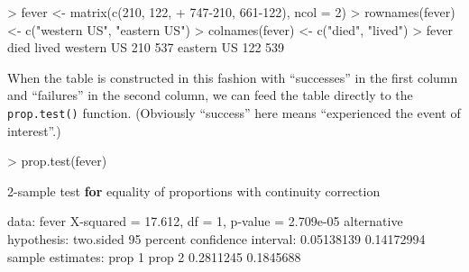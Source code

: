 \documentclass[
]{book}
\newenvironment{Shaded}{\begin{snugshade}}{\end{snugshade}}
\newcommand{\AttributeTok}[1]{\textcolor[rgb]{0.77,0.63,0.00}{#1}}
\newcommand{\ControlFlowTok}[1]{\textcolor[rgb]{0.13,0.29,0.53}{\textbf{#1}}}
\newcommand{\DecValTok}[1]{\textcolor[rgb]{0.00,0.00,0.81}{#1}}
\newcommand{\FloatTok}[1]{\textcolor[rgb]{0.00,0.00,0.81}{#1}}
\newcommand{\FunctionTok}[1]{\textcolor[rgb]{0.00,0.00,0.00}{#1}}
\newcommand{\NormalTok}[1]{#1}
\newcommand{\OtherTok}[1]{\textcolor[rgb]{0.56,0.35,0.01}{#1}}
\newcommand{\SpecialCharTok}[1]{\textcolor[rgb]{0.00,0.00,0.00}{#1}}
\newcommand{\StringTok}[1]{\textcolor[rgb]{0.31,0.60,0.02}{#1}}
\begin{document}
\begin{Shaded}
\begin{Highlighting}[]
\SpecialCharTok{\textgreater{}}\NormalTok{ fever }\OtherTok{\textless{}{-}} \FunctionTok{matrix}\NormalTok{(}\FunctionTok{c}\NormalTok{(}\DecValTok{210}\NormalTok{, }\DecValTok{122}\NormalTok{,}
\SpecialCharTok{+}                   \DecValTok{747{-}210}\NormalTok{, }\DecValTok{661{-}122}\NormalTok{), }\AttributeTok{ncol =} \DecValTok{2}\NormalTok{)}
\SpecialCharTok{\textgreater{}} \FunctionTok{rownames}\NormalTok{(fever) }\OtherTok{\textless{}{-}} \FunctionTok{c}\NormalTok{(}\StringTok{"western US"}\NormalTok{, }\StringTok{"eastern US"}\NormalTok{)}
\SpecialCharTok{\textgreater{}} \FunctionTok{colnames}\NormalTok{(fever) }\OtherTok{\textless{}{-}} \FunctionTok{c}\NormalTok{(}\StringTok{"died"}\NormalTok{, }\StringTok{"lived"}\NormalTok{)}
\SpecialCharTok{\textgreater{}}\NormalTok{ fever}
\NormalTok{           died lived}
\NormalTok{western US  }\DecValTok{210}   \DecValTok{537}
\NormalTok{eastern US  }\DecValTok{122}   \DecValTok{539}
\end{Highlighting}
\end{Shaded}

When the table is constructed in this fashion with ``successes'' in the first column and ``failures'' in the second column, we can feed the table directly to the \texttt{prop.test()} function. (Obviously ``success'' here means ``experienced the event of interest''.)

\begin{Shaded}
\begin{Highlighting}[]
\SpecialCharTok{\textgreater{}} \FunctionTok{prop.test}\NormalTok{(fever)}

    \DecValTok{2}\SpecialCharTok{{-}}\NormalTok{sample test }\ControlFlowTok{for}\NormalTok{ equality of proportions with continuity correction}

\NormalTok{data}\SpecialCharTok{:}\NormalTok{  fever}
\NormalTok{X}\SpecialCharTok{{-}}\NormalTok{squared }\OtherTok{=} \FloatTok{17.612}\NormalTok{, df }\OtherTok{=} \DecValTok{1}\NormalTok{, p}\SpecialCharTok{{-}}\NormalTok{value }\OtherTok{=} \FloatTok{2.709e{-}05}
\NormalTok{alternative hypothesis}\SpecialCharTok{:}\NormalTok{ two.sided}
\DecValTok{95}\NormalTok{ percent confidence interval}\SpecialCharTok{:}
 \FloatTok{0.05138139} \FloatTok{0.14172994}
\NormalTok{sample estimates}\SpecialCharTok{:}
\NormalTok{   prop }\DecValTok{1}\NormalTok{    prop }\DecValTok{2} 
\FloatTok{0.2811245} \FloatTok{0.1845688} 
\end{Highlighting}
\end{Shaded}
\end{document}

